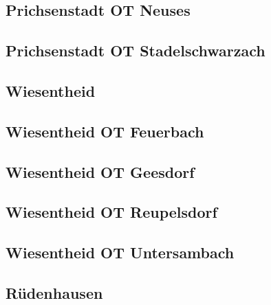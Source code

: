 \documentclass[fontsize=12pt,a4paper]{scrreprt}
\begin{document}
                \subsection{Prichsenstadt OT Neuses}
                
                
                \subsection{Prichsenstadt OT Stadelschwarzach}
                
                
                \subsection{Wiesentheid}
                
                
                \subsection{Wiesentheid OT Feuerbach}
                
                
                \subsection{Wiesentheid OT Geesdorf}
                
                
                \subsection{Wiesentheid OT Reupelsdorf}
                
                
                \subsection{Wiesentheid OT Untersambach}
                
                
                \subsection{Rüdenhausen}
                
                
\end{document}

